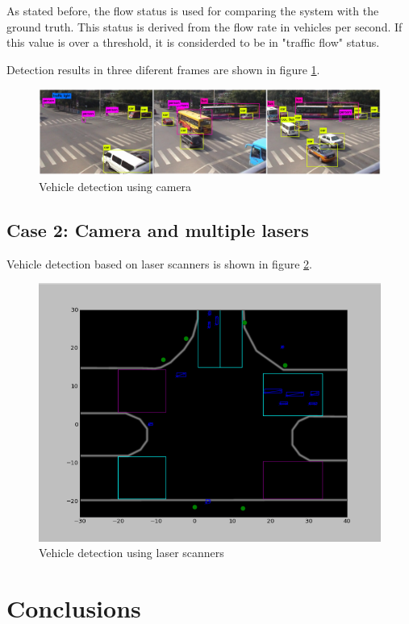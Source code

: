 As stated before, the flow status is used for comparing the system with the ground truth. This status is derived from the flow rate in vehicles per second. If this value is over a threshold, it is considerded to be in "traffic flow" status.

Detection results in three diferent frames are shown in figure \ref{camera_detection}.

\begin{figure}[ht!]
\centering
\includegraphics[scale=0.115]{fig/4/camera.jpeg}
\caption{Vehicle detection using camera}
\label{camera_detection}
\end{figure}

\subsection{Case 2: Camera and multiple lasers}

Vehicle detection based on laser scanners is shown in figure \ref{laser_detection}.

\begin{figure}[ht!]
\centering
\includegraphics[scale=0.43]{fig/4/laser1.png}
\caption{Vehicle detection using laser scanners}
\label{laser_detection}
\end{figure}

\section{Conclusions}


